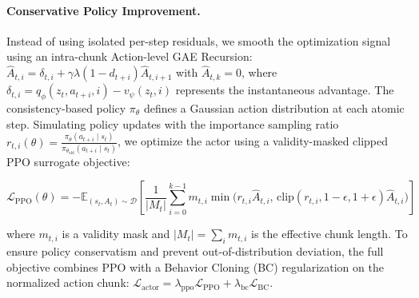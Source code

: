 \documentclass{article}
\begin{document}
\paragraph{Conservative Policy Improvement.} Instead of using isolated per-step residuals, we smooth the optimization signal using an intra-chunk Action-level GAE Recursion: $\hat A_{t,i} = \delta_{t,i} + \gamma\lambda(1-d_{t+i})\hat A_{t,i+1}$ with $\hat A_{t,k}=0$, where $\delta_{t,i}=q_\phi(z_t,a_{t+i},i)-v_\psi(z_t,i)$ represents the instantaneous advantage. The consistency-based policy $\pi_\theta$ defines a Gaussian action distribution at each atomic step. Simulating policy updates with the importance sampling ratio $r_{t,i}(\theta) = \frac{\pi_\theta(a_{t+i}\mid s_t)}{\pi_{\theta_{\mathrm{old}}}(a_{t+i}\mid s_t)}$, we optimize the actor using a validity-masked clipped PPO surrogate objective:

\begin{equation}
\label{eq:ppo_full}
\mathcal{L}_{\mathrm{PPO}}(\theta) = - \mathbb{E}_{(s_t,A_t)\sim\mathcal D} \left[ \frac{1}{|M_t|} \sum_{i=0}^{k-1} m_{t,i} \min \Big( r_{t,i}\hat A_{t,i}, \, \text{clip}(r_{t,i},1-\epsilon,1+\epsilon)\hat A_{t,i} \Big) \right]
\end{equation}

where $m_{t,i}$ is a validity mask and $|M_t| = \sum_i m_{t,i}$ is the effective chunk length. To ensure policy conservatism and prevent out-of-distribution deviation, the full objective combines PPO with a Behavior Cloning (BC) regularization on the normalized action chunk: $\mathcal{L}_{\mathrm{actor}} = \lambda_{\mathrm{ppo}} \mathcal{L}_{\mathrm{PPO}} + \lambda_{\mathrm{bc}}\mathcal{L}_{\mathrm{BC}}$.

\end{document}
